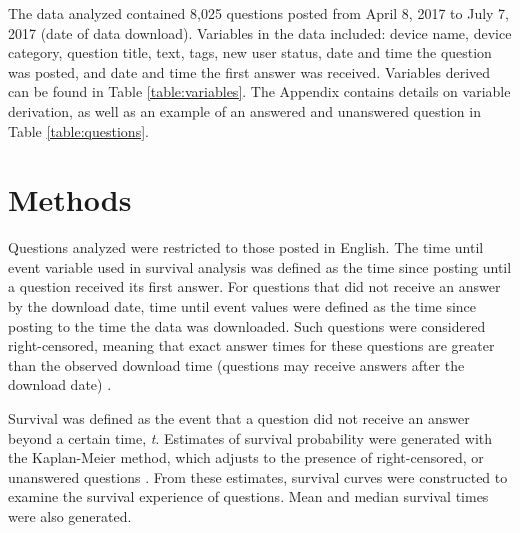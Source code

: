 \documentclass[preprint]{elsarticle}
\begin{document}
The data analyzed contained 8,025 questions posted from April 8, 2017 to July 7, 2017 (date of data download). Variables in the data included: device name, device category, question title, text, tags, new user status, date and time the question was posted, and date and time the first answer was received. Variables derived can be found in Table \ref{table:variables}. The Appendix contains details on variable derivation, as well as an example of an answered and unanswered question in Table \ref{table:questions}. 


\section{Methods}

Questions analyzed were restricted to those posted in English. The time until event variable used in survival analysis was defined as the time since posting until a question received its first answer. For questions that did not receive an answer by the download date, time until event values were defined as the time since posting to the time the data was downloaded. Such questions were considered right-censored, meaning that exact answer times for these questions are greater than the observed download time (questions may receive answers after the download date) \cite{Kleinbaum2011}. 

Survival was defined as the event that a question did not receive an answer beyond a certain time, \textit{t}. Estimates of survival probability were generated with the Kaplan-Meier method, which adjusts to the presence of right-censored, or unanswered questions \cite{Bland1998}. From these estimates, survival curves were constructed to examine the survival experience of questions. Mean and median survival times were also generated. 
\end{document}
